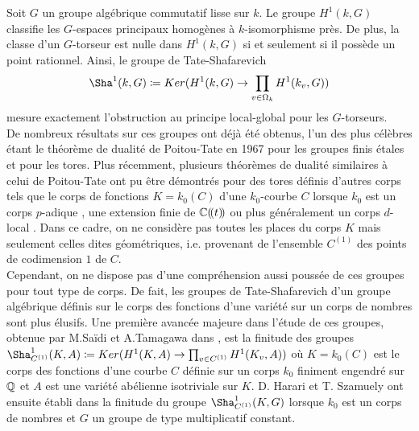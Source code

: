 \documentclass[11pt]{article}
\begin{document}
Soit $G$ un groupe algébrique commutatif lisse sur $k$. Le groupe $H^1(k,G)$ classifie les $G$-espaces principaux homogènes à $k$-isomorphisme près. De plus, la classe d'un $G$-torseur est nulle dans $H^1(k,G)$ si et seulement si il possède un point rationnel. Ainsi, le groupe de Tate-Shafarevich
$$
\Sha^1(k,G) \coloneqq Ker(H^1(k,G) \ra \prod_{v \in \Omega_k}H^1(k_v,G))
$$
mesure exactement l'obstruction au principe local-global pour les $G$-torseurs.\\

De nombreux résultats sur ces groupes ont déjà été obtenus, l'un des plus célèbres étant le théorème de dualité de Poitou-Tate en 1967 pour les groupes finis étales et pour les tores. Plus récemment, plusieurs théorèmes de dualité similaires à celui de Poitou-Tate ont pu être démontrés pour des tores définis d'autres corps tels que le corps de fonctions $K =k_0(C)$ d'une $k_0$-courbe $C$ lorsque $k_0$ est un corps $p$-adique \cite{HarSza2}, une extension finie de $\mathbb{C}(\!(t)\!)$ \cite{Colliot_Th_l_ne_2015} ou plus généralement un corps $d$-local \cite{Izquierdo2}.  Dans ce cadre, on ne considère pas toutes les places du corps $K$ mais seulement celles dites géométriques, i.e. provenant de l'ensemble $C^{(1)}$ des points de codimension $1$ de $C$.\\

Cependant, on ne dispose pas d'une compréhension aussi poussée de ces groupes pour tout type de corps. De fait, les groupes de Tate-Shafarevich d'un groupe algébrique définis sur le corps des fonctions d'une variété sur un corps de nombres sont plus élusifs. Une première avancée majeure dans l'étude de ces groupes, obtenue par M.Saïdi et A.Tamagawa dans \cite{SaïdiTamagawa}, est la finitude des groupes $\Sha^1_{C^{(1)}}(K,A) \coloneqq Ker(H^1(K,A) \ra \prod_{v \in C^{(1)}}H^1(K_v,A))$ où $K=k_0(C)$ est le corps des fonctions d'une courbe $C$ définie sur un corps $k_0$ finiment engendré sur $\mathbb{Q}$ et $A$ est une variété abélienne isotriviale sur $K$.
D. Harari et T. Szamuely ont ensuite établi dans \cite{HarSza} la finitude du groupe $\Sha^1_{C^{(1)}}(K,G)$ lorsque $k_0$ est un corps de nombres et $G$ un groupe de type multiplicatif constant. \\
\end{document}
